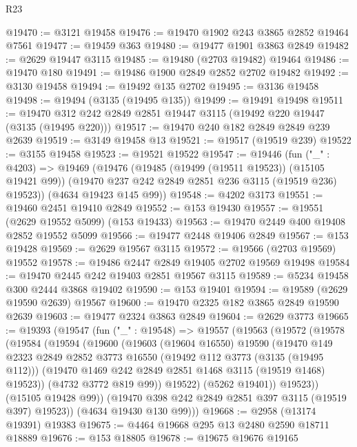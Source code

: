 \begin{lexlean}{R23}
\begin{coremodule}
@19470 := @3121 @19458
@19476 := @19470 @1902 @243 @3865 @2852 @19464 @7561
@19477 := @19459 @363
@19480 := @19477 @1901 @3863 @2849
@19482 := @2629 @19447 @3115
@19485 := @19480 (@2703 @19482) @19464
@19486 := @19470 @180
@19491 := @19486 @1900 @2849 @2852 @2702 @19482
@19492 := @3130 @19458
@19494 := @19492 @135 @2702
@19495 := @3136 @19458
@19498 := @19494 (@3135 (@19495 @135))
@19499 := @19491 @19498
@19511 := @19470 @312 @242 @2849 @2851 @19447 @3115 (@19492 @220 @19447 (@3135 (@19495 @220)))
@19517 := @19470 @240 @182 @2849 @2849 @239 @2639
@19519 := @3149 @19458 @13
@19521 := @19517 (@19519 @239)
@19522 := @3155 @19458
@19523 := @19521 @19522
@19547 := @19446
    (fun ("_" : @4203) =>
    @19469
      (@19476
        (@19485 (@19499 (@19511 @19523)) (@15105 @19421 @99))
        (@19470 @237 @242 @2849 @2851 @236 @3115 (@19519 @236) @19523))
      (@4634 @19423 @145 @99))
@19548 := @4202 @3173
@19551 := @19460 @2451 @19410 @2849
@19552 := @153 @19430
@19557 := @19551 (@2629 @19552 @5099) (@153 @19433)
@19563 := @19470 @2449 @400 @19408 @2852 @19552 @5099
@19566 := @19477 @2448 @19406 @2849
@19567 := @153 @19428
@19569 := @2629 @19567 @3115
@19572 := @19566 (@2703 @19569) @19552
@19578 := @19486 @2447 @2849 @19405 @2702 @19569 @19498
@19584 := @19470 @2445 @242 @19403 @2851 @19567 @3115
@19589 := @5234 @19458 @300 @2444 @3868 @19402
@19590 := @153 @19401
@19594 := @19589 (@2629 @19590 @2639) @19567
@19600 := @19470 @2325 @182 @3865 @2849 @19590 @2639
@19603 := @19477 @2324 @3863 @2849
@19604 := @2629 @3773
@19665 := @19393
    (@19547
      (fun ("_" : @19548) =>
      @19557
        (@19563
          (@19572
            (@19578
              (@19584
                (@19594
                  (@19600
                    (@19603
                      (@19604 @16550)
                      @19590
                      (@19470
                        @149
                        @2323
                        @2849
                        @2852
                        @3773
                        @16550
                        (@19492 @112 @3773 (@3135 (@19495 @112)))
                        (@19470 @1469 @242 @2849 @2851 @1468 @3115 (@19519 @1468) @19523))
                      (@4732 @3772 @819 @99))
                    @19522)
                  (@5262 @19401))
                @19523))
            (@15105 @19428 @99))
          (@19470 @398 @242 @2849 @2851 @397 @3115 (@19519 @397) @19523))
        (@4634 @19430 @130 @99)))
@19668 := @2958 (@13174 @19391) @19383
@19675 := @4464 @19668 @295 @13 @2480 @2590 @18711 @18889
@19676 := @153 @18805
@19678 := @19675 @19676 @19165

\end{coremodule}
\end{lexlean}
